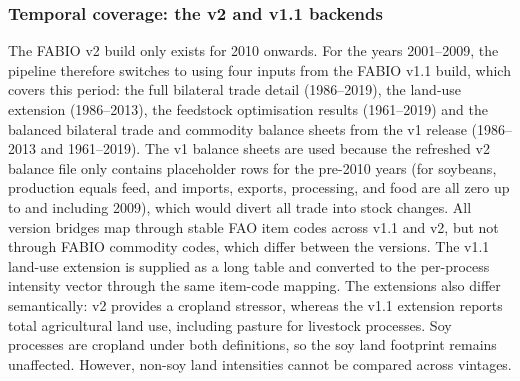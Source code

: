 \documentclass[pdflatex,sn-nature]{sn-jnl}%
\begin{document}
\subsubsection{Temporal coverage: the v2 and v1.1 backends}\label{subsubsec:backend}
The FABIO v2 build only exists for 2010 onwards. For the years 2001–2009, the pipeline therefore switches to using four inputs from the FABIO v1.1 build, which covers this period: the full bilateral trade detail (1986–2019), the land-use extension (1986–2013), the feedstock optimisation results (1961–2019) and the balanced bilateral trade and commodity balance sheets from the v1 release (1986–2013 and 1961–2019). The v1 balance sheets are used because the refreshed v2 balance file only contains placeholder rows for the pre-2010 years (for soybeans, production equals feed, and imports, exports, processing, and food are all zero up to and including 2009), which would divert all trade into stock changes. All version bridges map through stable FAO item codes across v1.1 and v2, but not through FABIO commodity codes, which differ between the versions. The v1.1 land-use extension is supplied as a long table and converted to the per-process intensity vector through the same item-code mapping. The extensions also differ semantically: v2 provides a cropland stressor, whereas the v1.1 extension reports total agricultural land use, including pasture for livestock processes. Soy processes are cropland under both definitions, so the soy land footprint remains unaffected. However, non-soy land intensities cannot be compared across vintages.
\end{document}
